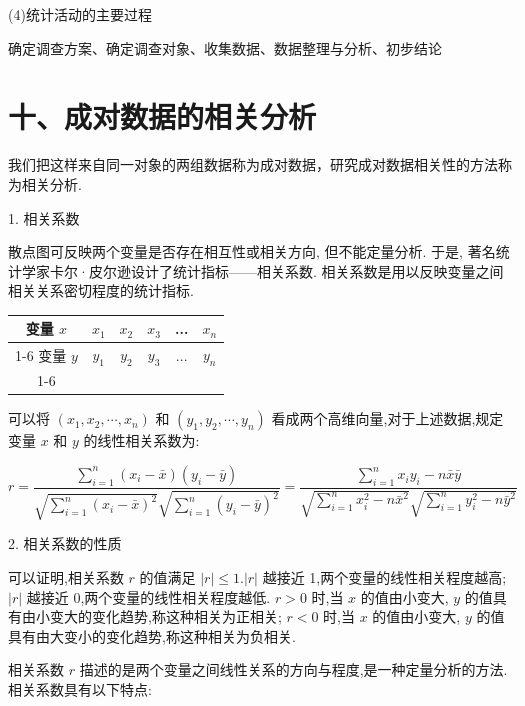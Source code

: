 (4)统计活动的主要过程

确定调查方案、确定调查对象、收集数据、数据整理与分析、初步结论

\section*{十、成对数据的相关分析}

我们把这样来自同一对象的两组数据称为成对数据，研究成对数据相关性的方法称为相关分析.

1. 相关系数

散点图可反映两个变量是否存在相互性或相关方向, 但不能定量分析. 于是, 著名统计学家卡尔·皮尔逊设计了统计指标——相关系数. 相关系数是用以反映变量之间相关关系密切程度的统计指标.

\begin{center}
\begin{tabular}{|c|c|c|c|c|c|}
\hline
变量 $x$ & ${x}_{1}$ & ${x}_{2}$ & ${x}_{3}$ & ... & ${x}_{n}$ \\
\cline{1-6}
变量 $y$ & ${y}_{1}$ & ${y}_{2}$ & ${y}_{3}$ & ... & ${y}_{n}$ \\
\cline{1-6}
\hline
\end{tabular}
\end{center}

可以将 $\left( {{x}_{1},{x}_{2},\cdots ,{x}_{n}}\right)$ 和 $\left( {{y}_{1},{y}_{2},\cdots ,{y}_{n}}\right)$ 看成两个高维向量,对于上述数据,规定变量 $x$ 和 $y$ 的线性相关系数为:

\[
r = \dfrac{\mathop{\sum }\limits_{{i = 1}}^{n}\left( {{x}_{i} - \bar{x}}\right) \left( {{y}_{i} - \bar{y}}\right) }{\sqrt{\mathop{\sum }\limits_{{i = 1}}^{n}{\left( {x}_{i} - \bar{x}\right) }^{2}}\sqrt{\mathop{\sum }\limits_{{i = 1}}^{n}{\left( {y}_{i} - \bar{y}\right) }^{2}}} = \dfrac{\mathop{\sum }\limits_{{i = 1}}^{n}{x}_{i}{y}_{i} - n\bar{x}\bar{y}}{\sqrt{\mathop{\sum }\limits_{{i = 1}}^{n}{x}_{i}^{2} - n{\bar{x}}^{2}}\sqrt{\mathop{\sum }\limits_{{i = 1}}^{n}{y}_{i}^{2} - n{\bar{y}}^{2}}}
\]

2. 相关系数的性质

可以证明,相关系数 $r$ 的值满足 $\left| r\right|  \leq  1.\left| r\right|$ 越接近 1,两个变量的线性相关程度越高; $\left| r\right|$ 越接近 0,两个变量的线性相关程度越低. $r > 0$ 时,当 $x$ 的值由小变大, $y$ 的值具有由小变大的变化趋势,称这种相关为正相关; $r < 0$ 时,当 $x$ 的值由小变大, $y$ 的值具有由大变小的变化趋势,称这种相关为负相关.

相关系数 $r$ 描述的是两个变量之间线性关系的方向与程度,是一种定量分析的方法. 相关系数具有以下特点:

